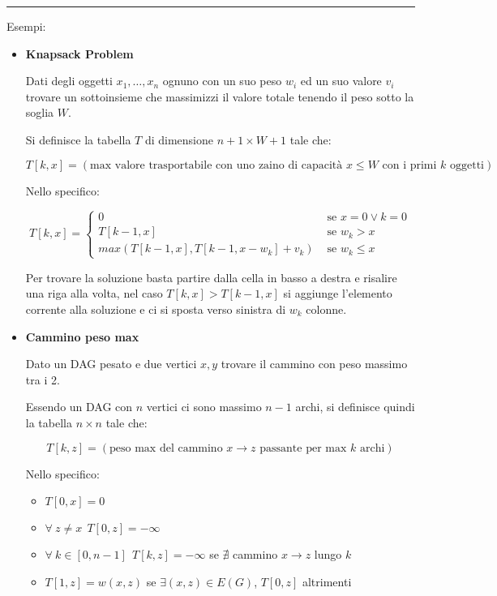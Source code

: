 \documentclass{article}
\begin{document}
\noindent\rule{\textwidth}{0.5pt}
Esempi:
\begin{itemize}
    \item \textbf{Knapsack Problem}
    
            Dati degli oggetti $x_1,\ldots,x_n$ ognuno con un suo peso $w_i$ ed un suo valore $v_i$ trovare un sottoinsieme che massimizzi il valore totale tenendo il peso sotto la soglia $W$.\newline
    
            Si definisce la tabella $T$ di dimensione $n+1\times W+1$ tale che:
    
            $$T[k,x]=(\text{max valore trasportabile con uno zaino di capacità $x\leq W$ con i primi $k$ oggetti})$$\newline
    
            Nello specifico:
    
            \[T[k,x]=\begin{cases}
                0 & \text{ se } x=0\vee k=0\\
                T[k-1,x]& \text{ se } w_k>x\\
                max(T[k-1,x],T[k-1,x-w_k]+v_k)& \text{ se } w_k\leq x
            \end{cases}\]\newline
    
    
            Per trovare la soluzione basta partire dalla cella in basso a destra e risalire una riga alla volta, nel caso $T[k,x]>T[k-1,x]$ si aggiunge l'elemento corrente alla soluzione e ci si sposta verso sinistra di $w_k$ colonne.

    \newpage

    \item \textbf{Cammino peso max}

            Dato un DAG pesato e due vertici $x,y$ trovare il cammino con peso massimo tra i 2.\newline
    
            Essendo un DAG con $n$ vertici ci sono massimo $n-1$ archi, si definisce quindi la tabella $n\times n$ tale che:
    
            $$T[k,z]=(\text{peso max del cammino $x\rightarrow z$ passante per max $k$ archi})$$\newline
    
            Nello specifico:
            \begin{itemize}
                \item $T[0,x]=0$
                \item $\forall\ z\neq x\ \ T[0,z]=-\infty$
                \item $\forall\ k\in[0,n-1]\ \ T[k,z]=-\infty$ se $\nexists$ cammino $x\rightarrow z$ lungo $k$
                \item $T[1,z]=w(x,z)$ se $\exists(x,z)\in E(G)$, $T[0,z]$ altrimenti\newline
            \end{itemize}
    

\end{itemize}
\end{document}
